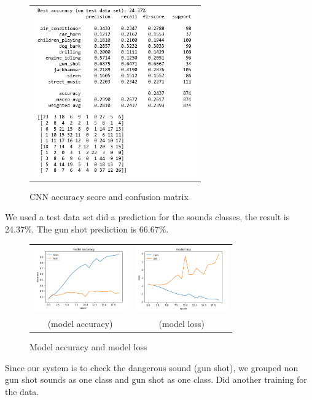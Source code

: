 \documentclass{article}
\begin{document}
\begin{figure}[!htb]
    \begin{tabular}{c}
        \includegraphics[width=7cm]{pic/CNN_Pm.png}\\
    \end{tabular}
	\caption{ CNN accuracy score and confusion matrix\label{figure7}}
\end{figure}
\newpage
We used a test data set did a prediction for the sounds classes, the result is 24.37\%. The gun shot prediction is 66.67\%.
\begin{figure}[!htb]
    \begin{tabular}{cc}
        \includegraphics[width=4cm]{pic/CNN_ACC.png}
        &\includegraphics[width=4cm]{pic/CNN_LOSS.PNG}\\
    (model accuracy)&(model loss)
    \end{tabular}
	\caption{Model accuracy and model loss\label{figure8}}
\end{figure}
\newpage
Since our system is to check the dangerous sound (gun shot), we grouped non gun shot sounds as one class and gun shot as one class. Did another training for the data.
\end{document}
